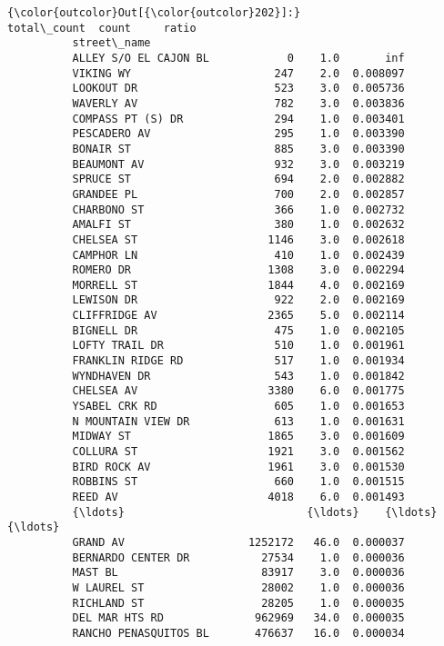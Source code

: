 \documentclass[11pt]{article}
\begin{document}
\begin{Verbatim}[commandchars=\\\{\}]
{\color{outcolor}Out[{\color{outcolor}202}]:}                        total\_count  count     ratio
          street\_name                                        
          ALLEY S/O EL CAJON BL            0    1.0       inf
          VIKING WY                      247    2.0  0.008097
          LOOKOUT DR                     523    3.0  0.005736
          WAVERLY AV                     782    3.0  0.003836
          COMPASS PT (S) DR              294    1.0  0.003401
          PESCADERO AV                   295    1.0  0.003390
          BONAIR ST                      885    3.0  0.003390
          BEAUMONT AV                    932    3.0  0.003219
          SPRUCE ST                      694    2.0  0.002882
          GRANDEE PL                     700    2.0  0.002857
          CHARBONO ST                    366    1.0  0.002732
          AMALFI ST                      380    1.0  0.002632
          CHELSEA ST                    1146    3.0  0.002618
          CAMPHOR LN                     410    1.0  0.002439
          ROMERO DR                     1308    3.0  0.002294
          MORRELL ST                    1844    4.0  0.002169
          LEWISON DR                     922    2.0  0.002169
          CLIFFRIDGE AV                 2365    5.0  0.002114
          BIGNELL DR                     475    1.0  0.002105
          LOFTY TRAIL DR                 510    1.0  0.001961
          FRANKLIN RIDGE RD              517    1.0  0.001934
          WYNDHAVEN DR                   543    1.0  0.001842
          CHELSEA AV                    3380    6.0  0.001775
          YSABEL CRK RD                  605    1.0  0.001653
          N MOUNTAIN VIEW DR             613    1.0  0.001631
          MIDWAY ST                     1865    3.0  0.001609
          COLLURA ST                    1921    3.0  0.001562
          BIRD ROCK AV                  1961    3.0  0.001530
          ROBBINS ST                     660    1.0  0.001515
          REED AV                       4018    6.0  0.001493
          {\ldots}                            {\ldots}    {\ldots}       {\ldots}
          GRAND AV                   1252172   46.0  0.000037
          BERNARDO CENTER DR           27534    1.0  0.000036
          MAST BL                      83917    3.0  0.000036
          W LAUREL ST                  28002    1.0  0.000036
          RICHLAND ST                  28205    1.0  0.000035
          DEL MAR HTS RD              962969   34.0  0.000035
          RANCHO PENASQUITOS BL       476637   16.0  0.000034

\end{Verbatim}
\end{document}

